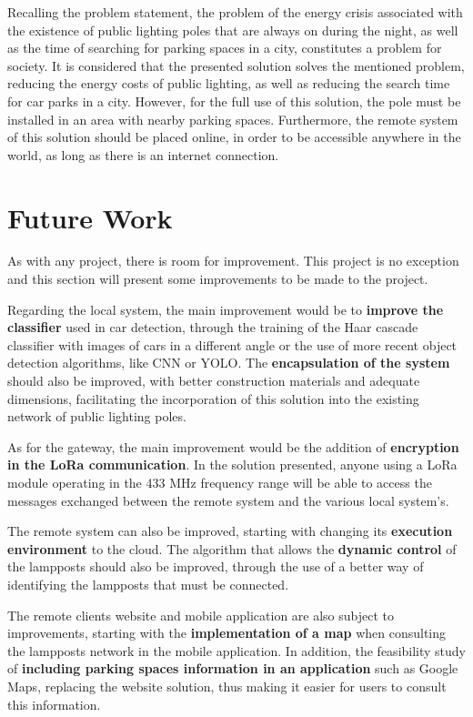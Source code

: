 Recalling the problem statement, the problem of the energy crisis associated with the existence of public lighting poles that are always on during the night, as well as the time of searching for parking spaces in a city, constitutes a problem for society. It is considered that the presented solution solves the mentioned problem, reducing the energy costs of public lighting, as well as reducing the search time for car parks in a city. However, for the full use of this solution, the pole must be installed in an area with nearby parking spaces. Furthermore, the remote system of this solution should be placed online, in order to be accessible anywhere in the world, as long as there is an internet connection.

\section{Future Work}
As with any project, there is room for improvement. This project is no exception and this section will present some improvements to be made to the project.

Regarding the local system, the main improvement would be to \textbf{improve the classifier} used in car detection, through the training of the Haar cascade classifier with images of cars in a different angle or the use of more recent object detection algorithms, like CNN or YOLO. The \textbf{encapsulation of the system} should also be improved, with better construction materials and adequate dimensions, facilitating the incorporation of this solution into the existing network of public lighting poles.

As for the gateway, the main improvement would be the addition of \textbf{encryption in the LoRa communication}. In the solution presented, anyone using a LoRa module operating in the 433 MHz frequency range will be able to access the messages exchanged between the remote system and the various local system’s.

The remote system can also be improved, starting with changing its \textbf{execution environment} to the cloud. The algorithm that allows the \textbf{dynamic control} of the lampposts should also be improved, through the use of a better way of identifying the lampposts that must be connected.

The remote clients website and mobile application are also subject to improvements, starting with the \textbf{implementation of a map} when consulting the lampposts network in the mobile application. In addition, the feasibility study of \textbf{including parking spaces information in an application} such as Google Maps, replacing the website solution, thus making it easier for users to consult this information.
